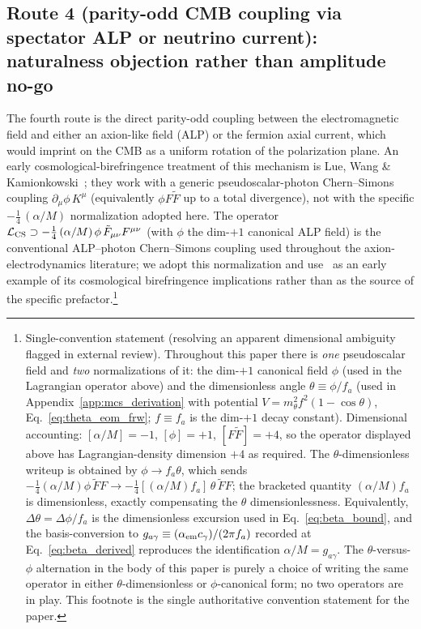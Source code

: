 \documentclass[aps,prd,twocolumn,superscriptaddress,showpacs,preprintnumbers,nofootinbib,longbibliography,floatfix]{revtex4-2}
\begin{document}
\subsection{Route 4 (parity-odd CMB coupling via spectator ALP or
neutrino current): naturalness objection rather than amplitude
no-go}
\label{sec:r4_birefringence}
The fourth route is the direct parity-odd coupling between the
electromagnetic field and either an axion-like field (ALP) or the
fermion axial current, which would imprint on the CMB as a uniform
rotation of the polarization plane. An early cosmological-birefringence treatment of this
mechanism is Lue, Wang \& Kamionkowski~\cite{LueWangKamionkowski1999};
they work with a generic pseudoscalar-photon Chern--Simons coupling
$\partial_\mu\phi\,K^\mu$ (equivalently $\phi F\tilde F$ up to a
total divergence), not with the specific
$-\tfrac{1}{4}\,(\alpha/M)$ normalization adopted here. The operator
\(\mathcal{L}_{\rm CS} \supset -\tfrac{1}{4}\,(\alpha/M)\,\phi\,
\tilde F_{\mu\nu} F^{\mu\nu}\) (with $\phi$ the dim-$+1$ canonical ALP
field) is the conventional ALP--photon
Chern--Simons coupling used throughout the axion-electrodynamics
literature; we adopt this normalization and use~\cite{LueWangKamionkowski1999}
as an early example of its cosmological birefringence
implications rather than as the source of the specific prefactor.\footnote{Single-convention
statement (resolving an apparent dimensional ambiguity flagged in external
review). Throughout this paper there is \emph{one} pseudoscalar field and
\emph{two} normalizations of it: the dim-$+1$ canonical field $\phi$
(used in the Lagrangian operator above) and the dimensionless angle
$\theta\equiv\phi/f_a$ (used in Appendix~\ref{app:mcs_derivation} with
potential $V=m_\theta^2 f^2(1-\cos\theta)$, Eq.~\eqref{eq:theta_eom_frw};
$f\equiv f_a$ is the dim-$+1$ decay constant). Dimensional accounting:
$[\alpha/M]=-1$, $[\phi]=+1$, $[F\tilde F]=+4$, so the operator displayed
above has Lagrangian-density dimension $+4$ as required. The
$\theta$-dimensionless writeup is obtained by $\phi\to f_a\theta$, which
sends $-\tfrac14(\alpha/M)\phi\,\tilde F F\to
-\tfrac14[(\alpha/M)f_a]\,\theta\,\tilde F F$; the bracketed quantity
$(\alpha/M)f_a$ is dimensionless, exactly compensating the $\theta$
dimensionlessness. Equivalently, $\Delta\theta=\Delta\phi/f_a$ is the
dimensionless excursion used in Eq.~\eqref{eq:beta_bound}, and the
basis-conversion to $g_{a\gamma}\equiv(\alpha_{\rm em}c_\gamma)/(2\pi f_a)$
recorded at Eq.~\eqref{eq:beta_derived} reproduces the identification
$\alpha/M=g_{a\gamma}$. The $\theta$-versus-$\phi$ alternation in the body
of this paper is purely a choice of writing the same operator in either
$\theta$-dimensionless or $\phi$-canonical form; no two operators are in
play. This footnote is the single authoritative convention statement for the paper.}
\end{document}
